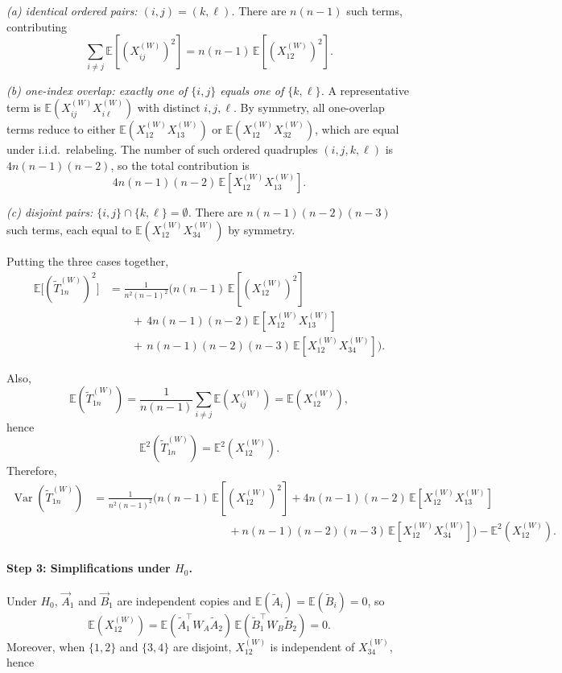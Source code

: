 \documentclass[12pt,reqno,oneside]{amsbook}
\theoremstyle{definition}
\theoremstyle{remark}
\DeclareMathOperator{\Var}{Var}
\begin{document}
\smallskip
\noindent
\emph{(a) identical ordered pairs: $(i,j)=(k,\ell)$.}
There are $n(n-1)$ such terms, contributing
\[
\sum_{i\neq j}\mathbb E\!\left[(X_{ij}^{(W)})^2\right]
=
n(n-1)\,\mathbb E\!\left[(X_{12}^{(W)})^2\right].
\]

\smallskip
\noindent
\emph{(b) one-index overlap: exactly one of $\{i,j\}$ equals one of $\{k,\ell\}$.}
A representative term is $\mathbb E(X_{ij}^{(W)}X_{i\ell}^{(W)})$ with distinct
$i,j,\ell$. By symmetry, all one-overlap terms reduce to either
$\mathbb E(X_{12}^{(W)}X_{13}^{(W)})$ or $\mathbb E(X_{12}^{(W)}X_{32}^{(W)})$,
which are equal under i.i.d.\ relabeling. The number of such ordered quadruples
$(i,j,k,\ell)$ is $4n(n-1)(n-2)$, so the total contribution is
\[
4n(n-1)(n-2)\,\mathbb E\!\left[X_{12}^{(W)}X_{13}^{(W)}\right].
\]

\smallskip
\noindent
\emph{(c) disjoint pairs: $\{i,j\}\cap\{k,\ell\}=\emptyset$.}
There are $n(n-1)(n-2)(n-3)$ such terms, each equal to
$\mathbb E(X_{12}^{(W)}X_{34}^{(W)})$ by symmetry.

\smallskip
Putting the three cases together,
\[
\begin{aligned}
\mathbb E\!\big[(\tilde T_{1n}^{(W)})^2\big]
&=
\frac{1}{n^2(n-1)^2}\Big(
  n(n-1)\,\mathbb E[(X_{12}^{(W)})^2] \\
&\qquad
+\,4n(n-1)(n-2)\,\mathbb E[X_{12}^{(W)}X_{13}^{(W)}] \\
&\qquad
+\,n(n-1)(n-2)(n-3)\,\mathbb E[X_{12}^{(W)}X_{34}^{(W)}]
\Big).
\end{aligned}
\]

Also,
\[
\mathbb E(\tilde T_{1n}^{(W)})
=
\frac{1}{n(n-1)}\sum_{i\neq j}\mathbb E(X_{ij}^{(W)})
=
\mathbb E(X_{12}^{(W)}),
\]
hence
\[
\mathbb E^2(\tilde T_{1n}^{(W)})=\mathbb E^2(X_{12}^{(W)}).
\]
Therefore,
\begin{align*}
\Var(\tilde T_{1n}^{(W)})
&=
\frac{1}{n^2(n-1)^2}\Big(
n(n-1)\,\mathbb E[(X_{12}^{(W)})^2]
+
4n(n-1)(n-2)\,\mathbb E[X_{12}^{(W)}X_{13}^{(W)}]\\
&\qquad\qquad\qquad\qquad\qquad\qquad
+
n(n-1)(n-2)(n-3)\,\mathbb E[X_{12}^{(W)}X_{34}^{(W)}]
\Big)
-
\mathbb E^2(X_{12}^{(W)}).
\end{align*}

\paragraph{Step 3: Simplifications under $H_0$.}
Under $H_0$, $\vec A_1$ and $\vec B_1$ are independent copies and
$\mathbb E(\tilde A_i)=\mathbb E(\tilde B_i)=0$, so
\[
\mathbb E(X_{12}^{(W)})
=
\mathbb E(\tilde A_1^\top W_A \tilde A_2)\,
\mathbb E(\tilde B_1^\top W_B \tilde B_2)
=0.
\]
Moreover, when $\{1,2\}$ and $\{3,4\}$ are disjoint, $X_{12}^{(W)}$ is independent
of $X_{34}^{(W)}$, hence
\end{document}
